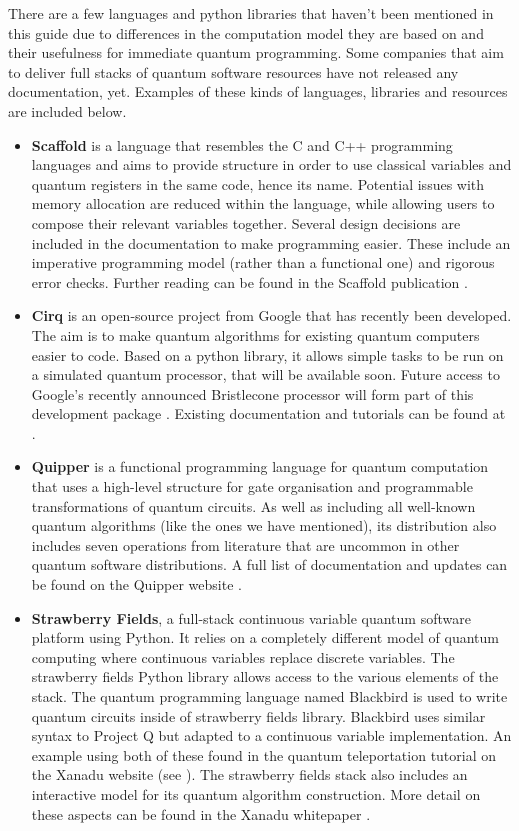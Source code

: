 There are a few languages and python libraries that haven't been mentioned in this guide due to differences in the computation model they are based on and their usefulness for immediate quantum programming. Some companies that aim to deliver full stacks of quantum software resources have not released any documentation, yet. Examples of these kinds of languages, libraries and resources are included below. 
\begin{itemize}
    \item \textbf{Scaffold} is a language that resembles the C and C++ programming languages and aims to provide structure in order to use classical variables and quantum registers in the same code, hence its name. Potential issues with memory allocation are reduced within the language, while allowing users to compose their relevant variables together. Several design decisions are included in the documentation to make programming easier. These include an imperative programming model (rather than a functional one) and rigorous error checks. Further reading can be found in the Scaffold publication \cite{Javadi2012}. 
    \item \textbf{Cirq} is an open-source project from Google that has recently been developed. The aim is to make quantum algorithms for existing quantum computers easier to code. Based on a python library, it allows simple tasks to be run on a simulated quantum processor, that will be available soon. Future access to Google's recently announced Bristlecone processor \cite{NISQ} will form part of this development package \cite{Cirqbristlecone}. Existing documentation and tutorials can be found at \cite{Cirq}.
    \item \textbf{Quipper} is a functional programming language for quantum computation that uses a high-level structure for gate organisation and programmable transformations of quantum circuits. As well as including all well-known quantum algorithms (like the ones we have mentioned), its distribution also includes seven operations from literature that are uncommon in other quantum software distributions. A full list of documentation and updates can be found on the Quipper website \cite{Quipper}.   
    \item \textbf{Strawberry Fields}, a full-stack continuous variable quantum software platform using Python. It relies on a completely different model of quantum computing where continuous variables replace discrete variables. The strawberry fields Python library allows access to the various elements of the stack. The quantum programming language named Blackbird is used to write quantum circuits inside of strawberry fields library. Blackbird uses similar syntax to Project Q but adapted to a continuous variable implementation. An example using both of these found in the quantum teleportation tutorial on the Xanadu website (see \cite{Strawberryfieldsteleportation}). The strawberry fields stack also includes an interactive  model for its quantum algorithm construction. More detail on these aspects can be found in the Xanadu whitepaper \cite{Xanadu2018}.
\end{itemize}
